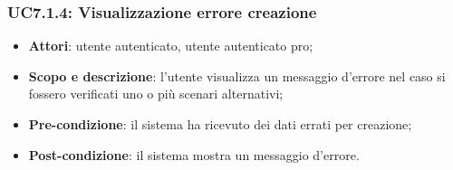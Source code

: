 	\subsubsection{UC7.1.4: Visualizzazione errore creazione}
	\begin{itemize}
		\item
			\textbf{Attori}: utente autenticato, utente autenticato pro;
		\item
			\textbf{Scopo e descrizione}: l'utente visualizza un messaggio d'errore nel caso si fossero verificati uno o più scenari alternativi;
		\item		
			\textbf{Pre-condizione}: il sistema ha ricevuto dei dati errati per creazione;
		\item
			\textbf{Post-condizione}: il sistema mostra un messaggio d'errore.
	\end{itemize}	

